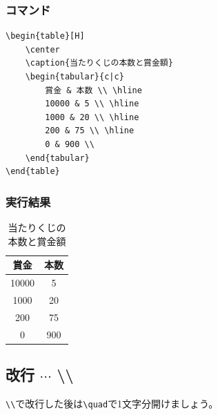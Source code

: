 \documentclass[a4j, titlepage]{jarticle}
\begin{document}
\begin{multicols}{2}
\subsubsection*{コマンド}
\begin{lstlisting}
\begin{table}[H]
    \center
    \caption{当たりくじの本数と賞金額}
    \begin{tabular}{c|c}
        賞金 & 本数 \\ \hline
        10000 & 5 \\ \hline
        1000 & 20 \\ \hline
        200 & 75 \\ \hline
        0 & 900 \\
    \end{tabular}
\end{table}
\end{lstlisting}

\columnbreak

\subsubsection*{実行結果}
\begin{screen}

    \begin{table}[H]
        \center
        \caption{当たりくじの本数と賞金額}
        \begin{tabular}{c|c}
            賞金 & 本数 \\ \hline
            10000 & 5 \\ \hline
            1000 & 20 \\ \hline
            200 & 75 \\ \hline
            0 & 900 \\
        \end{tabular}
    \end{table}

\end{screen}
\end{multicols}

\subsection{改行 $\cdots$ \textbackslash \textbackslash}
\verb|\\|で改行した後は\verb|\quad|で1文字分開けましょう。
\end{document}
